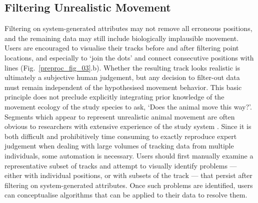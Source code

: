     \subsection*{Filtering Unrealistic Movement}

    Filtering on system-generated attributes may not remove all erroneous positions, and the remaining data may still include biologically implausible movement.
    Users are encouraged to visualise their tracks before and after filtering point locations, and especially to `join the dots' and connect consecutive positions with lines (Fig.~\ref{preproc_fig_03}.b).
    Whether the resulting track looks realistic is ultimately a subjective human judgement, but any decision to filter-out data must remain independent of the hypothesised movement behavior.
    This basic principle does not preclude explicitly integrating prior knowledge of the movement ecology of the study species to ask, `Does the animal move this way?'.
    Segments which appear to represent unrealistic animal movement are often obvious to researchers with extensive experience of the study system \citep[the non-movement approach; see][]{bjorneraas2010}.
    Since it is both difficult and prohibitively time consuming to exactly reproduce expert judgement when dealing with large volumes of tracking data from multiple individuals, some automation is necessary.
    Users should first manually examine a representative subset of tracks and attempt to visually identify problems --- either with individual positions, or with subsets of the track --- that persist after filtering on system-generated attributes.
    Once such problems are identified, users can conceptualise algorithms that can be applied to their data to resolve them.

